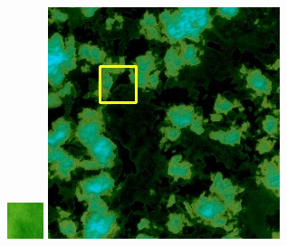 \documentclass[10pt]{ctexart}
\begin{document}
\begin{multicols}{2}
\begin{figure}[H]
{\begin{minipage}[b]{0.15\linewidth}
            \includegraphics[width=1\linewidth]{../log/spoon2/cut/tmp_cut_LC81321192014054LGN00_03055_spectral.jpg}\vspace{4pt}
            \includegraphics[width=1\linewidth]{../log/spoon2/cut/LC80350192014190LGN00_06561_spectral.jpg}\vspace{4pt}

\end{minipage}}
\end{figure}
\end{multicols}
\end{document}
